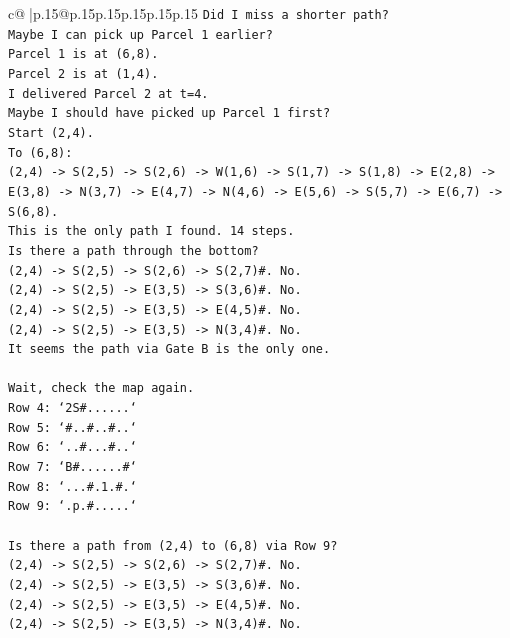 \documentclass{article}
\begin{document}
{\begin{supertabular}{c@{$\;$}|p{.15\linewidth}@{}p{.15\linewidth}p{.15\linewidth}p{.15\linewidth}p{.15\linewidth}p{.15\linewidth}}
{{{\texttt{Did I miss a shorter path?} \\
\texttt{Maybe I can pick up Parcel 1 earlier?} \\
\texttt{Parcel 1 is at (6,8).} \\
\texttt{Parcel 2 is at (1,4).} \\
\texttt{I delivered Parcel 2 at t=4.} \\
\texttt{Maybe I should have picked up Parcel 1 first?} \\
\texttt{Start (2,4).} \\
\texttt{To (6,8):} \\
\texttt{(2,4) {-}> S(2,5) {-}> S(2,6) {-}> W(1,6) {-}> S(1,7) {-}> S(1,8) {-}> E(2,8) {-}> E(3,8) {-}> N(3,7) {-}> E(4,7) {-}> N(4,6) {-}> E(5,6) {-}> S(5,7) {-}> E(6,7) {-}> S(6,8).} \\
\texttt{This is the only path I found. 14 steps.} \\
\texttt{Is there a path through the bottom?} \\
\texttt{(2,4) {-}> S(2,5) {-}> S(2,6) {-}> S(2,7)\#. No.} \\
\texttt{(2,4) {-}> S(2,5) {-}> E(3,5) {-}> S(3,6)\#. No.} \\
\texttt{(2,4) {-}> S(2,5) {-}> E(3,5) {-}> E(4,5)\#. No.} \\
\texttt{(2,4) {-}> S(2,5) {-}> E(3,5) {-}> N(3,4)\#. No.} \\
\texttt{It seems the path via Gate B is the only one.} \\
\\ 
\texttt{Wait, check the map again.} \\
\texttt{Row 4: `2S\#......`} \\
\texttt{Row 5: `\#..\#..\#..`} \\
\texttt{Row 6: `..\#...\#..`} \\
\texttt{Row 7: `B\#......\#`} \\
\texttt{Row 8: `...\#.1.\#.`} \\
\texttt{Row 9: `.p.\#.....`} \\
\\ 
\texttt{Is there a path from (2,4) to (6,8) via Row 9?} \\
\texttt{(2,4) {-}> S(2,5) {-}> S(2,6) {-}> S(2,7)\#. No.} \\
\texttt{(2,4) {-}> S(2,5) {-}> E(3,5) {-}> S(3,6)\#. No.} \\
\texttt{(2,4) {-}> S(2,5) {-}> E(3,5) {-}> E(4,5)\#. No.} \\
\texttt{(2,4) {-}> S(2,5) {-}> E(3,5) {-}> N(3,4)\#. No.} \\
}}}
\end{supertabular}}
\end{document}
